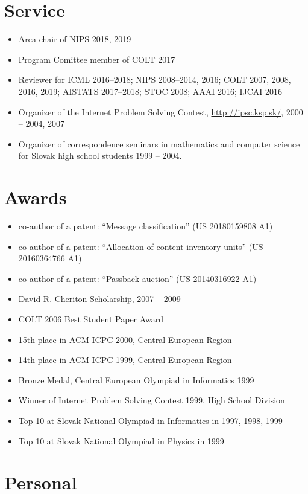 \documentclass[9pt]{article}
\begin{document}
\section*{Service}

\begin{itemize}
\item Area chair of NIPS 2018, 2019
\item Program Comittee member of COLT 2017
\item Reviewer for ICML 2016--2018; NIPS 2008--2014, 2016; COLT 2007, 2008, 2016, 2019; AISTATS 2017--2018; STOC 2008; AAAI 2016; IJCAI 2016
\item Organizer of the Internet Problem Solving Contest, \url{http://ipsc.ksp.sk/}, 2000 -- 2004, 2007
\item Organizer of correspondence seminars in mathematics and computer science for Slovak high school students 1999 -- 2004.
\end{itemize}

\section*{Awards}

\begin{itemize}
\item co-author of a patent: ``Message classification'' (US 20180159808 A1)
\item co-author of a patent: ``Allocation of content inventory units'' (US 20160364766 A1)
\item co-author of a patent: ``Passback auction'' (US 20140316922 A1)
\item David R. Cheriton Scholarship, 2007 -- 2009
\item COLT 2006 Best Student Paper Award
\item 15th place in ACM ICPC 2000, Central European Region
\item 14th place in ACM ICPC 1999, Central European Region
\item Bronze Medal, Central European Olympiad in Informatics 1999
\item Winner of Internet Problem Solving Contest 1999, High School Division
\item Top 10 at Slovak National Olympiad in Informatics in 1997, 1998, 1999
\item Top 10 at Slovak National Olympiad in Physics in 1999
\end{itemize}

\section*{Personal}
\end{document}
